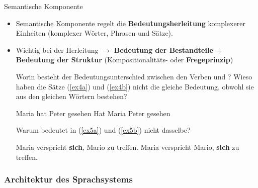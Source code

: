 \begin{frame}{Semantische Komponente}
	
	\begin{itemize}
		\item Semantische Komponente regelt die \textbf{Bedeutungsherleitung} komplexerer Einheiten (komplexer Wörter, Phrasen und Sätze).
		\item<2-> Wichtig bei der Herleitung $\rightarrow$ \textbf{Bedeutung der Bestandteile + Bedeutung der Struktur} (Kompositionalitäts- oder \textbf{Fregeprinzip})
				
\ea Worin besteht der Bedeutungsunterschied zwischen den Verben  und ?
	\ex Wieso haben die Sätze (\ref{ex4a}) und (\ref{ex4b}) nicht die gleiche Bedeutung, obwohl sie aus den gleichen Wörtern bestehen?
	
		\ea Maria hat Peter gesehen \label{ex4a}
			\ex Hat Maria Peter gesehen \label{ex4b}
		\z 

	\ex Warum bedeutet  in (\ref{ex5a}) und (\ref{ex5b}) nicht dasselbe?

		\ea Maria verspricht \textbf{sich}, Mario zu treffen. \label{ex5a}
			\ex Maria verspricht Mario, \textbf{sich} zu treffen. \label{ex5b}
		\z

\z
	\end{itemize}
	
\end{frame}


\subsubsection{Architektur des Sprachsystems}
		
